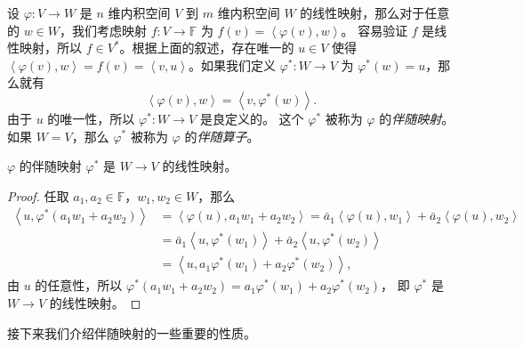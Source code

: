 \documentclass[fontset=none,zihao=-4]{Notes}
\newcommand{\inn}[1]{\left\langle#1\right\rangle}
\begin{document}
设 $\varphi:V\to W$ 是 $n$ 维内积空间 $V$ 到 $m$ 维内积空间 $W$ 的线性映射，那么对于任意的
$w\in W$，我们考虑映射 $f:V\to \mathbb{F}$ 为 $f(v)=\inn{\varphi(v),w}$。
容易验证 $f$ 是线性映射，所以 $f\in V^*$。根据上面的叙述，存在唯一的
$u\in V$ 使得 $\inn{\varphi(v),w}=f(v)=\inn{v,u}$。如果我们定义
$\varphi^*:W\to V$ 为 $\varphi^*(w)=u$，那么就有
\[
  \inn{\varphi(v),w}=\inn{v,\varphi^*(w)}.  
\]
由于 $u$ 的唯一性，所以 $\varphi^*:W\to V$ 是良定义的。
这个 $\varphi^*$ 被称为 $\varphi$ 的\emph{伴随映射}。
如果 $W=V$，那么 $\varphi^*$ 被称为 $\varphi$ 的\emph{伴随算子}。

\begin{proposition}
  $\varphi$ 的伴随映射 $\varphi^*$ 是 $W\to V$ 的线性映射。
\end{proposition}
\begin{proof}
  任取 $a_1,a_2\in\mathbb{F}$，$w_1,w_2\in W$，那么
  \begin{align*}
    \inn{u,\varphi^*(a_1w_1+a_2w_2)}&=
    \inn{\varphi(u),a_1w_1+a_2w_2}=
    \bar a_1\inn{\varphi(u),w_1}+\bar a_2\inn{\varphi(u),w_2}\\
    &=\bar a_1\inn{u,\varphi^*(w_1)}+\bar a_2\inn{u,\varphi^*(w_2)}\\
    &=\inn{u,a_1\varphi^*(w_1)+a_2\varphi^*(w_2)},
  \end{align*}
  由 $u$ 的任意性，所以 $\varphi^*(a_1w_1+a_2w_2)=a_1\varphi^*(w_1)+a_2\varphi^*(w_2)$，
  即 $\varphi^*$ 是 $W\to V$ 的线性映射。
\end{proof}

接下来我们介绍伴随映射的一些重要的性质。
\end{document}

